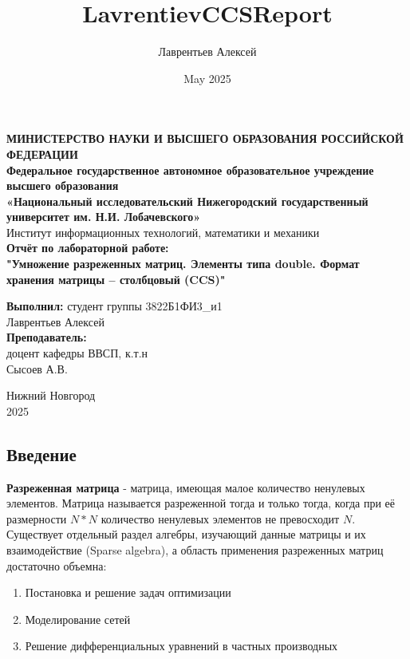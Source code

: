 \documentclass[12pt]{article}
\title{LavrentievCCSReport}
\author{Лаврентьев Алексей}
\date{May 2025}
\begin{document}
\begin{titlepage}
\begin{center}
\textbf{МИНИСТЕРСТВО НАУКИ И ВЫСШЕГО ОБРАЗОВАНИЯ РОССИЙСКОЙ ФЕДЕРАЦИИ} \\
\textbf{Федеральное государственное автономное образовательное учреждение высшего образования \\ «Национальный исследовательский Нижегородский государственный университет им. Н.И. Лобачевского»} \\
Институт информационных технологий, математики и механики \\
\vspace{3cm}
{\Large
\textbf{Отчёт по лабораторной работе:} \\[0.5cm]
\textbf{"Умножение разреженных матриц. Элементы типа double. Формат хранения матрицы – столбцовый (CCS)"} \\
}
\vspace{2cm}
\begin{flushright}
\textbf{Выполнил:} студент группы 3822Б1ФИ3_и1\\
Лаврентьев Алексей \\
\vspace{0.5cm}
\textbf{Преподаватель:} \\
доцент кафедры ВВСП, к.т.н \\ Сысоев А.В.
\end{flushright}
\vspace{2.5cm}
Нижний Новгород \\
2025
\end{center}
\end{titlepage}
\begin{center}
    \section*{Введение}
\end{center}
\textbf{Разреженная матрица} - матрица, имеющая малое количество ненулевых элементов. Матрица называется разреженной тогда и только тогда, когда при её размерности $N*N$ количество ненулевых элементов не превосходит $N$. Существует отдельный раздел алгебры, изучающий данные матрицы и их взаимодействие (Sparse algebra), а область применения разреженных матриц достаточно объемна: 
\begin{enumerate}
    \item Постановка и решение задач оптимизации
    \item Моделирование сетей
    \item Решение дифференциальных уравнений в частных производных
\end{enumerate}
\end{document}
